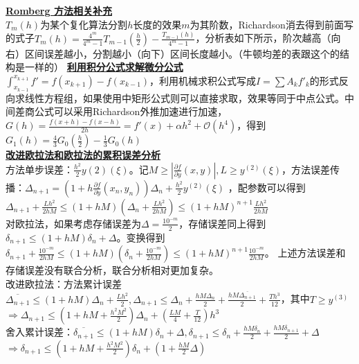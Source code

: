\documentclass[UTF8,a4paper,landscape,compress]{paper}
\renewcommand{\subsection}[1]{{\small\textbf{\underline{#1}}}\\ }
\begin{document}
\begin{multicols}{4}
    \subsection{Romberg 方法相关补充}
    $T_m(h)$为某个复化算法分割$h$长度的效果$m$为其阶数，Richardson消去得到前面写的式子$T_m(h) = \frac{4^m}{4^m-1}T_{m-1}(\frac h2) - \frac {T_{m-1}(h)}{4^m-1}$，分析表如下所示，阶次越高（向右）区间误差越小，分割越小（向下）区间长度越小。（牛顿均差的表跟这个的结构是一样的）
    \subsection{利用积分公式求解微分公式}
    $\int_{x_{k-1}}^{x_{k+1}}f' = f(x_{k+1}) - f(x_{k-1})$，利用机械求积公式写成$I = \sum A_kf'_k$的形式反向求线性方程组，如果使用中矩形公式则可以直接求取，效果等同于中点公式。中间差商公式可以采用Richardson外推加速进行加速，$G(h) = \frac{f(x+h) - f(x-h)}{2h} = f'(x) + \alpha h^2 + \mathcal O(h^4)$，得到$G_1(h) = \frac43G_0(\frac h2) -\frac13G_0(h)$\\
    \subsection{改进欧拉法和欧拉法的累积误差分析}
    方法单步误差：$\frac {h^2}2y{(2)}(\xi)$。记$M \ge |\frac{\partial f}{\partial y}(x,y)|,L \ge y^{(2)}(\xi)$，方法误差传播：$\Delta_{n+1} = (1 + h\frac{\partial f}{\partial y}(x_n,y_n))\Delta_n + \frac {h^2}2y^{(2)}(\xi)$ ，配参数可以得到$\Delta_{n+1} + \frac {Lh^2}{2hM} \le (1 + hM)(\Delta_{n} + \frac {Lh^2}{2hM}) \le (1 + hM)^{n+1}\frac {Lh^2}{2hM}$\\
    对欧拉法，如果考虑存储误差为$\Delta = \frac{10^{-m}}2$，存储误差同上得到$\delta_{n+1}\le (1+hM)\delta_n + \Delta$。变换得到$\delta_{n+1} + \frac{10^{-m}}{2hM} \le (1 +hM)(\delta_n+\frac{10^{-m}}{2hM}) \le (1 + hM)^{n+1}\frac{10^{-m}}{2hM}$。
    上述方法误差和存储误差没有联合分析，联合分析相对更加复杂。\\
    改进欧拉法：方法累计误差$\overline{\Delta_{n+1}} \le (1+hM)\Delta_n + \frac{Lh^2}2,\Delta_{n+1} \le \Delta_n + \frac{hM\Delta_n}2 + \frac {hM\overline{\Delta_{n+1}}}2 + \frac{Th^3}{12}$，其中$T \ge y^{(3)}$\\
    $\Rightarrow \Delta_{n+1} \le (1 + hM + \frac{h^2M^2}2)\Delta_n + (\frac{LM}4+\frac T{12})h^3$\\
    舍入累计误差：$\overline{\delta_{n+1}} \le (1 + hM)\delta_n + \Delta,\delta_{n+1} \le \delta_n + \frac {hM\delta_n}2 + \frac{hM\delta_{n+1}}2 + \Delta$\\
    $\Rightarrow \delta_{n+1} \le (1 + hM + \frac{h^2M^2}2)\delta_n + (1 +\frac{hM}2\Delta)$\\

\end{multicols}
\end{document}
